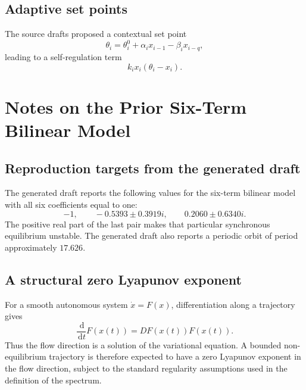 \documentclass[11pt, reqno]{amsart}
\theoremstyle{definition}
\theoremstyle{remark}
\newcommand{\dd}{\,\mathrm{d}}
\begin{document}
	\subsection{Adaptive set points}
	
	The source drafts proposed a contextual set point
	\begin{equation}
		\label{eq:adaptive-setpoint}
		\theta_i
		=
		\theta_i^0
		+\alpha_i x_{i-1}
		-\beta_i x_{i-q},
	\end{equation}
	leading to a self-regulation term
	\begin{equation}
		\label{eq:adaptive-logistic}
		k_i x_i(\theta_i-x_i).
	\end{equation}
	
	
	\section{Notes on the Prior Six-Term Bilinear Model}
	\label{app:lin-han}
	
	\subsection{Reproduction targets from the generated draft}
	
	The generated draft reports the following values for the six-term bilinear
	model with all six coefficients equal to one:
	\begin{equation}
		\label{eq:reported-bilinear-eigs}
		-1,
		\qquad
		-0.5393\pm0.3919i,
		\qquad
		0.2060\pm0.6340i.
	\end{equation}
	The positive real part of the last pair makes that particular synchronous
	equilibrium unstable.  The generated draft also reports a periodic orbit of
	period approximately $17.626$.
	
	
	\subsection{A structural zero Lyapunov exponent}
	
	For a smooth autonomous system $\dot x=F(x)$, differentiation along a trajectory
	gives
	\[
	\frac{\dd}{\dd t}F(x(t))
	=
	DF(x(t))F(x(t)).
	\]
	Thus the flow direction is a solution of the variational equation.  A bounded
	non-equilibrium trajectory is therefore expected to have a zero Lyapunov
	exponent in the flow direction, subject to the standard regularity assumptions
	used in the definition of the spectrum.
	
\end{document}
